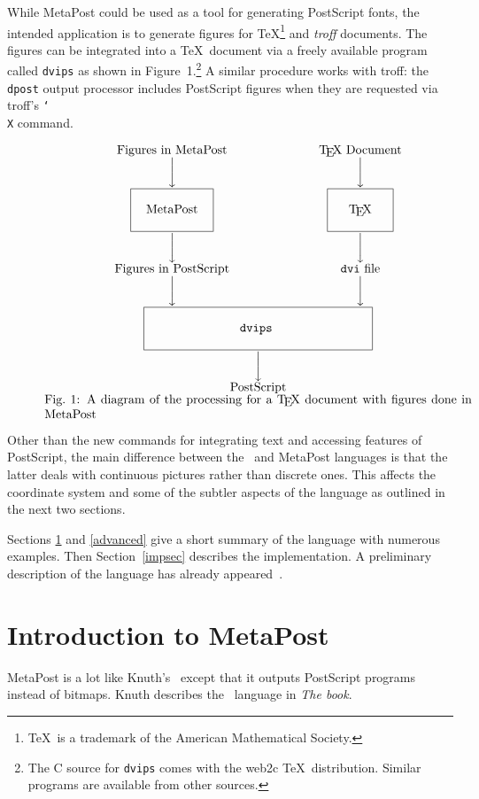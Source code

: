 While MetaPost could be used as a tool for generating PostScript fonts,
the intended application is to generate figures for \TeX\footnote{\TeX\ is a
trademark of the American Mathematical Society.} and {\it troff\/} documents.
The figures can be integrated into a \TeX\ document via a freely available
program called {\tt dvips} as shown in Figure~1.\footnote{The C source for
{\tt dvips} comes with the web2c \TeX\ distribution. Similar programs are
available from other sources.}  A similar procedure works with troff: the
{\tt dpost} output processor includes PostScript figures when they are
requested via troff's {\tt \char`\\X} command.

\begin{figure}[htp]
$$ \def\fbox#1{\hbox{\vrule
	\vbox{\hrule\kern5pt\hbox{\kern5pt\hbox{#1}\kern5pt}\kern5pt\hrule}%
	\vrule}}
   \vbox{
    \halign{$\hfil#\hfil$&\hskip1in$\hfil#\hfil$\cr
	\hbox{Figures in MetaPost}&
	\hbox{\TeX\ Document}
	\cr
	\bigg\downarrow&
	\bigg\downarrow
	\cr
	\fbox{\vrule height.2in depth.133in width0pt
		\kern .1in MetaPost\kern.1in}
	&
	\fbox{\vrule height.2in depth.133in width0pt
		\kern .167in \TeX\kern.167in}
	\cr
	\bigg\downarrow&
	\bigg\downarrow
	\cr
	\hbox{Figures in PostScript}&
	\hbox{{\tt dvi} file}
	\cr
	\bigg\downarrow&
	\bigg\downarrow
	\cr
	\fbox{\vrule height.2in depth.133in width0pt
		\kern 1in {\tt dvips} \kern1in}
	\span\omit\cr
	\bigg\downarrow\span\omit\cr
	\hbox{PostScript}\span\omit\cr}}
   \atop
   \vbox{\noindent Fig.~1: A diagram of the processing for a \TeX\ document with figures
	done in Meta\-Post}
$$
\end{figure}

Other than the new commands for integrating text and accessing features of
PostScript, the main difference between the \MF\ and MetaPost languages is
that the latter deals with continuous pictures rather than discrete ones.
This affects the coordinate system and some of the subtler aspects of the
language as outlined in the next two sections.

Sections \ref{basic} and \ref{advanced} give a short summary of the language
with numerous examples.  Then Section~\ref{impsec} describes the implementation.
A preliminary description of the language has already appeared~\cite{ho:mp1}.

\section{Introduction to MetaPost}
\label{basic}
MetaPost is a lot like Knuth's \MF\
except that it outputs PostScript programs instead
of bitmaps.  Knuth describes the \MF\ language in {\sl The \MF book\/}.~\cite{kn:d}

